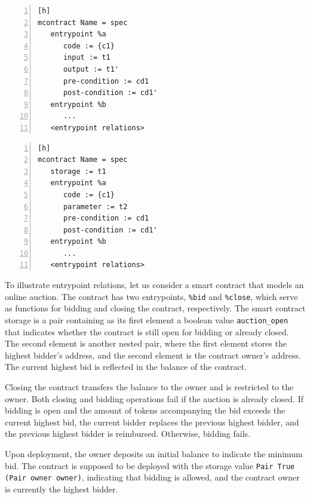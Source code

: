 \documentclass[a4paper,USenglish,cleveref, autoref,anonymous]{lipics-v2021}
\begin{document}
\begin{lstlisting}[float,captionpos=b,caption={Multiple entrypoint specification syntax (option 1)},label={lst:multiple-entrypoint-specification-1},numbers=left][h]
mcontract Name = spec
   entrypoint %a 
      code := {c1}
      input := t1
      output := t1'
      pre-condition := cd1
      post-condition := cd1'
   entrypoint %b 
      ...
   <entrypoint relations>
\end{lstlisting}

\begin{lstlisting}[float,captionpos=b,caption={Multiple entrypoint specification syntax (option 2)},label={lst:multiple-entrypoint-specification-2},numbers=left][h]
mcontract Name = spec
   storage := t1
   entrypoint %a 
      code := {c1}
      parameter := t2
      pre-condition := cd1
      post-condition := cd1'
   entrypoint %b 
      ...
   <entrypoint relations>
\end{lstlisting}

To illustrate entrypoint relations, let us consider a smart contract
that models an online auction. The contract has two entrypoints,
\lstinline|%bid| and \lstinline|%close|, which serve as functions for
bidding and closing the contract, respectively.  The smart contract
storage is a pair containing as its first element a boolean value
\lstinline|auction_open| that indicates whether the contract is still
open for bidding or already closed. The second element is another
nested pair, where the first element stores the highest bidder's
address, and the second element is the contract owner's address. The
current highest bid is reflected in the balance of the contract. 

Closing the contract transfers the balance to the owner and is
restricted to the owner. Both closing and bidding operations fail if
the auction is already closed. If bidding is open and the amount of
tokens accompanying the bid exceeds the current highest bid, the
current bidder replaces the previous highest bidder, and the previous
highest bidder is reimbursed. Otherwise, bidding fails. 

Upon deployment, the owner deposits an initial balance to indicate the minimum bid. The contract is supposed to be deployed with the storage value  \lstinline/Pair True (Pair owner owner)/, indicating that bidding is allowed, and the contract owner is currently the highest bidder.
\end{document}
